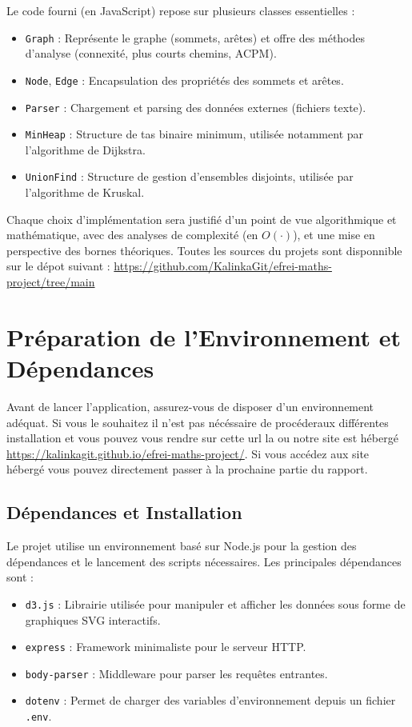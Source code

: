 \documentclass[a4paper,12pt]{article}
\begin{document}
Le code fourni (en JavaScript) repose sur plusieurs classes essentielles :
\begin{itemize}
    \item \texttt{Graph} : Représente le graphe (sommets, arêtes) et offre des méthodes d’analyse (connexité, plus courts chemins, ACPM).
    \item \texttt{Node}, \texttt{Edge} : Encapsulation des propriétés des sommets et arêtes.
    \item \texttt{Parser} : Chargement et parsing des données externes (fichiers texte).
    \item \texttt{MinHeap} : Structure de tas binaire minimum, utilisée notamment par l’algorithme de Dijkstra.
    \item \texttt{UnionFind} : Structure de gestion d'ensembles disjoints, utilisée par l’algorithme de Kruskal.
\end{itemize}

Chaque choix d’implémentation sera justifié d’un point de vue algorithmique et mathématique, avec des analyses de complexité (en $O(\cdot)$), et une mise en perspective des bornes théoriques. Toutes les sources du projets sont disponnible sur le dépot suivant : \url{https://github.com/KalinkaGit/efrei-maths-project/tree/main}


\section{Préparation de l'Environnement et Dépendances}

Avant de lancer l’application, assurez-vous de disposer d’un environnement adéquat. Si vous le souhaitez il n'est pas nécéssaire de procéderaux différentes installation et vous pouvez vous rendre sur cette url la ou notre site est hébergé \url{https://kalinkagit.github.io/efrei-maths-project/}. Si vous accédez aux site hébergé vous pouvez directement passer à la prochaine partie du rapport.

\subsection{Dépendances et Installation}

Le projet utilise un environnement basé sur Node.js pour la gestion des dépendances et le lancement des scripts nécessaires. Les principales dépendances sont :

\begin{itemize}
    \item \texttt{d3.js} : Librairie utilisée pour manipuler et afficher les données sous forme de graphiques SVG interactifs.
    \item \texttt{express} : Framework minimaliste pour le serveur HTTP.
    \item \texttt{body-parser} : Middleware pour parser les requêtes entrantes.
    \item \texttt{dotenv} : Permet de charger des variables d’environnement depuis un fichier \texttt{.env}.
\end{itemize}
\end{document}
